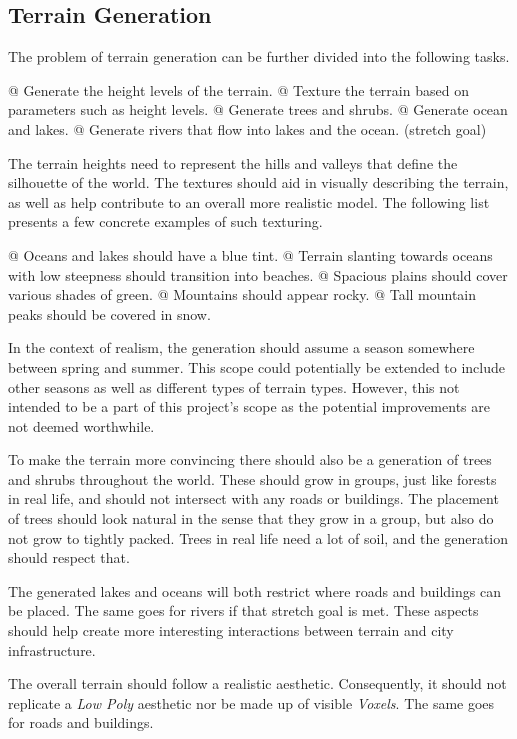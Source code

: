 \subsection{Terrain Generation}

The problem of terrain generation can be further divided into the following tasks.
\begin{easylist}
  @ Generate the height levels of the terrain.
  @ Texture the terrain based on parameters such as height levels.
  @ Generate trees and shrubs.
  @ Generate ocean and lakes.
  @ Generate rivers that flow into lakes and the ocean. (stretch goal)
\end{easylist}

The terrain heights need to represent the hills and valleys that define the silhouette of the world.
The textures should aid in visually describing the terrain, as well as help contribute to an overall more realistic model.
The following list presents a few concrete examples of such texturing.
\begin{easylist}
  @ Oceans and lakes should have a blue tint.
  @ Terrain slanting towards oceans with low steepness should transition into beaches.
  @ Spacious plains should cover various shades of green.
  @ Mountains should appear rocky.
  @ Tall mountain peaks should be covered in snow.
\end{easylist}

In the context of realism, the generation should assume a season somewhere between spring and summer.
This scope could potentially be extended to include other seasons as well as different types of terrain types.
However, this not intended to be a part of this project's scope as the potential improvements are not deemed worthwhile.

To make the terrain more convincing there should also be a generation of trees and shrubs throughout the world.
These should grow in groups, just like forests in real life, and should not intersect with any roads or buildings.
The placement of trees should look natural in the sense that they grow in a group, but also do not grow to tightly packed.
Trees in real life need a lot of soil, and the generation should respect that.

The generated lakes and oceans will both restrict where roads and buildings can be placed.
The same goes for rivers if that stretch goal is met.
These aspects should help create more interesting interactions between terrain and city infrastructure.

The overall terrain should follow a realistic aesthetic.
Consequently, it should not replicate a \textit{Low Poly} aesthetic nor be made up of visible \textit{Voxels}.
The same goes for roads and buildings.